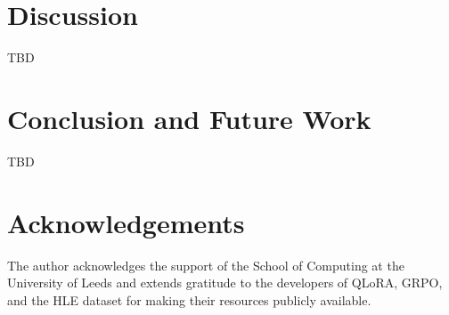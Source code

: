 \documentclass{svproc}
\begin{document}


\section{Discussion}
TBD




\section{Conclusion and Future Work}
TBD




\section{Acknowledgements}
The author acknowledges the support of the School of Computing at the University of Leeds and extends gratitude to the developers of QLoRA, GRPO, and the HLE dataset for making their resources publicly available.




\printbibliography
\end{document}
